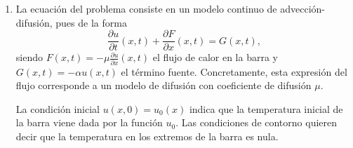 \documentclass[11pt]{report}
\begin{document}
\begin{solution}
    \hfill
    \begin{enumerate}
        \item La ecuación del problema consiste en un modelo continuo de advección-difusión, pues de la forma
        \[\frac{\partial u}{\partial t}(x,t)+\frac{\partial F}{\partial x}(x,t) = G(x,t),\]
        siendo $F(x,t) = -\mu\frac{\partial u}{\partial x}(x,t)$ el flujo de calor en la barra y $G(x,t) = -\alpha u(x,t)$ el término fuente. Concretamente, esta expresión del flujo corresponde a un modelo de difusión con coeficiente de difusión $\mu$.
        
        La condición inicial $u(x,0) = u_0(x)$ indica que la temperatura inicial de la barra viene dada por la función $u_0$. Las condiciones de contorno quieren decir que la temperatura en los extremos de la barra es nula.


\end{enumerate}
\end{solution}
\end{document}
